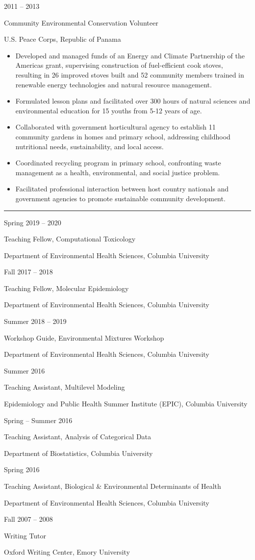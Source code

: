\documentclass[a4paper,10pt]{article}
\newlength{\cvcolumngapwidth}
\newlength{\cvleftcolumnwidth}
\newlength{\cvrightcolumnwidth}
\newcommand{\cvsectionstyle}[1]{{\normalsize\cvsectionfont\textcolor{cvsectioncolor}{#1}}}
\newcommand{\cvtitlestyle}[1]{{\large\cvtitlefont\textcolor{cvtitlecolor}{#1}}}
\newcommand{\cvdurationstyle}[1]{{\small\cvdurationfont\textcolor{cvdurationcolor}{#1}}}
\newlength{\cvafteritemskipamount}
\newlength{\cvaftersectionskipamount}
\newlength{\cvaftertitleskipamount}
\newlength{\cvparskip}
\newcommand{\cvsection}[1]{
    \begin{minipage}[t]{\cvleftcolumnwidth}
        \raggedleft\cvsectionstyle{#1}
    \end{minipage}%
    \hspace{\cvcolumngapwidth}%
    \begin{minipage}[t]{\cvrightcolumnwidth}
        \textcolor{cvrulecolor}{\rule{\cvrightcolumnwidth}{0.3mm}}
    \end{minipage}

    \vspace{\cvaftersectionskipamount}
}
\newcommand{\cvitem}[2]{
    \begin{minipage}[t]{\cvleftcolumnwidth}
        \raggedleft #1
    \end{minipage}%
    \hspace{\cvcolumngapwidth}%
    \begin{minipage}[t]{\cvrightcolumnwidth}
        \setlength{\parskip}{\cvparskip} #2
    \end{minipage}

    \vspace{\cvafteritemskipamount}
}
\newcommand{\cvtitle}[1]{
    \cvtitlestyle{#1}

    \vspace{\cvaftertitleskipamount}
    \vspace{-\cvparskip}
}
\begin{document}
\cvitem{
    \cvdurationstyle{2011 -- 2013}
}{
    \cvtitle{Community Environmental Conservation Volunteer}

    U.S. Peace Corps, Republic of Panama

    \begin{itemize}[leftmargin=*]
    	\item Developed and managed funds of an Energy and Climate Partnership of the Americas grant, supervising construction of fuel-efficient cook stoves, resulting in 26 improved stoves built and 52 community members trained in renewable energy technologies and natural resource management.
    	\item Formulated lesson plans and facilitated over 300 hours of natural sciences and environmental education for 15 youths from 5-12 years of age.
        \item Collaborated with government horticultural agency to establish 11 community gardens in homes and primary school, addressing childhood nutritional needs, sustainability, and local access.
 	\item Coordinated recycling program in primary school, confronting waste management as a health, environmental, and social justice problem.
	\item Facilitated professional interaction between host country nationals and government agencies to promote sustainable community development.
    \end{itemize}
}


\cvsection{TEACHING EXPERIENCE}

\cvitem{
    \cvdurationstyle{Spring 2019 -- 2020}
}{
    \cvtitle{Teaching Fellow, Computational Toxicology}
    Department of Environmental Health Sciences, Columbia University   
}
\cvitem{
    \cvdurationstyle{Fall 2017 -- 2018}
}{
    \cvtitle{Teaching Fellow, Molecular Epidemiology}
    Department of Environmental Health Sciences, Columbia University   
}
\cvitem{
    \cvdurationstyle{Summer 2018 -- 2019}
}{
    \cvtitle{Workshop Guide, Environmental Mixtures Workshop}
    Department of Environmental Health Sciences, Columbia University   
}
\cvitem{
    \cvdurationstyle{Summer 2016}
}{
    \cvtitle{Teaching Assistant, Multilevel Modeling}
    Epidemiology and Public Health Summer Institute (EPIC), Columbia University   
}
\cvitem{
    \cvdurationstyle{Spring -- Summer 2016}
}{
    \cvtitle{Teaching Assistant, Analysis of Categorical Data}
    Department of Biostatistics, Columbia University   
}
\cvitem{
    \cvdurationstyle{Spring 2016}
}{
    \cvtitle{Teaching Assistant, Biological \& Environmental Determinants of Health}
    Department of Environmental Health Sciences, Columbia University   
}
\cvitem{
    \cvdurationstyle{Fall 2007 -- 2008}
}{
    \cvtitle{Writing Tutor}
    Oxford Writing Center, Emory University 
}
\end{document}
